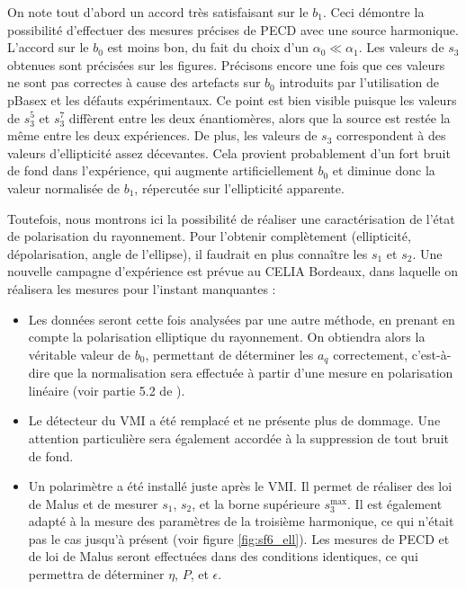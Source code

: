 On note tout d'abord un accord très satisfaisant sur le $b_1$. Ceci démontre la possibilité d'effectuer des mesures précises de PECD avec une source harmonique. L'accord sur le $b_0$ est moins bon, du fait du choix d'un $\alpha_0\ll\alpha_1$. Les valeurs de $s_3$ obtenues sont précisées sur les figures. Précisons encore une fois que ces valeurs ne sont pas correctes à cause des artefacts sur $b_0$ introduits par l'utilisation de pBasex et les défauts expérimentaux. Ce point est bien visible puisque les valeurs de $s_3^5$ et $s_3^7$ diffèrent entre les deux énantiomères, alors que la source est restée la même entre les deux expériences. De plus, les valeurs de $s_3$ correspondent à des valeurs d'ellipticité assez décevantes. Cela provient probablement d'un fort bruit de fond dans l'expérience, qui augmente artificiellement $b_0$ et diminue donc la valeur normalisée de $b_1$, répercutée sur l'ellipticité apparente.\par
Toutefois, nous montrons ici la possibilité de réaliser une caractérisation de l'état de polarisation du rayonnement. Pour l'obtenir complètement (ellipticité, dépolarisation, angle de l'ellipse), il faudrait en plus connaître les $s_1$ et $s_2$. Une nouvelle campagne d'expérience est prévue au CELIA Bordeaux, dans laquelle on réalisera les mesures pour l'instant manquantes :


\begin{itemize}
\renewcommand{\labelitemi}{$\bullet$}
\setlength\itemsep{1em}
\item Les données seront cette fois analysées par une autre méthode, en prenant en compte la polarisation elliptique du rayonnement. On obtiendra alors la véritable valeur de $b_0$, permettant de déterminer les $a_q$ correctement, c'est-à-dire que la normalisation sera effectuée à partir d'une mesure en polarisation linéaire (voir partie 5.2 de ).
\item Le détecteur du VMI a été remplacé et ne présente plus de dommage. Une attention particulière sera également accordée à la suppression de tout bruit de fond.
\item Un polarimètre a été installé juste après le VMI. Il permet de réaliser des loi de Malus et de mesurer $s_1$, $s_2$, et la borne supérieure $s_3^{\text{max}}$. Il est également adapté à la mesure des paramètres de la troisième harmonique, ce qui n'était pas le cas jusqu'à présent (voir figure \ref{fig:sf6_ell}). Les mesures de PECD et de loi de Malus seront effectuées dans des conditions identiques, ce qui permettra de déterminer $\eta$, $P$, et $\epsilon$. 
\end{itemize}
\newpage
